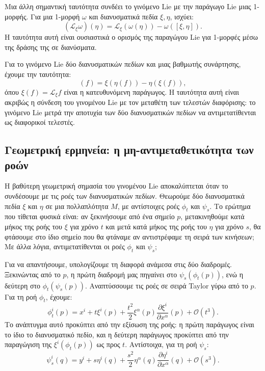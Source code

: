 \documentclass[12pt]{article}
\begin{document}
Μια άλλη σημαντική ταυτότητα συνδέει το γινόμενο Lie με την παράγωγο Lie μιας 1-μορφής. Για μια 1-μορφή $\omega$ και διανυσματικά πεδία $\xi, \eta$, ισχύει:
\begin{equation}
(\mathcal{L}_\xi \omega)(\eta) = \mathcal{L}_\xi (\omega(\eta)) - \omega([\xi, \eta]).
\end{equation}
Η ταυτότητα αυτή είναι ουσιαστικά ο ορισμός της παραγώγου Lie για 1-μορφές μέσω της δράσης της σε διανύσματα.

Για το γινόμενο Lie δύο διανυσματικών πεδίων και μιας βαθμωτής συνάρτησης, έχουμε την ταυτότητα:
\begin{equation}
[\xi, \eta](f) = \xi(\eta(f)) - \eta(\xi(f)),
\end{equation}
όπου $\xi(f) = \mathcal{L}_\xi f$ είναι η κατευθυνόμενη παράγωγος. Η ταυτότητα αυτή είναι ακριβώς η σύνδεση του γινομένου Lie με τον μεταθέτη των τελεστών διαφόρισης: το γινόμενο Lie μετρά την αποτυχία των δύο διανυσματικών πεδίων να αντιμετατίθενται ως διαφορικοί τελεστές.

\subsection{Γεωμετρική ερμηνεία: η μη-αντιμεταθετικότητα των ροών}

Η βαθύτερη γεωμετρική σημασία του γινομένου Lie αποκαλύπτεται όταν το συνδέσουμε με τις ροές των διανυσματικών πεδίων. Θεωρούμε δύο διανυσματικά πεδία $\xi$ και $\eta$ σε μια πολλαπλότητα $M$, με αντίστοιχες ροές $\phi_t$ και $\psi_s$. Το ερώτημα που τίθεται φυσικά είναι: αν ξεκινήσουμε από ένα σημείο $p$, μετακινηθούμε κατά μήκος της ροής του $\xi$ για χρόνο $t$ και μετά κατά μήκος της ροής του $\eta$ για χρόνο $s$, θα φτάσουμε στο ίδιο σημείο που θα φτάναμε αν αντιστρέφαμε τη σειρά των κινήσεων; Με άλλα λόγια, αντιμετατίθενται οι ροές $\phi_t$ και $\psi_s$;

Για να απαντήσουμε, υπολογίζουμε τη διαφορά ανάμεσα στις δύο διαδρομές. Ξεκινώντας από το $p$, η πρώτη διαδρομή μας πηγαίνει στο $\psi_s(\phi_t(p))$, ενώ η δεύτερη στο $\phi_t(\psi_s(p))$. Αναπτύσσουμε τις ροές σε σειρά Taylor γύρω από το $p$. Για τη ροή $\phi_t$, έχουμε:
\begin{equation}
\phi_t^i(p) = x^i + t \xi^i(p) + \frac{t^2}{2} \xi^\alpha(p) \frac{\partial \xi^i}{\partial x^\alpha}(p) + \mathcal{O}(t^3).
\end{equation}
Το ανάπτυγμα αυτό προκύπτει από την εξίσωση της ροής: η πρώτη παράγωγος είναι το ίδιο το διανυσματικό πεδίο, και η δεύτερη παράγωγος προκύπτει από την παραγώγιση της $\xi^i(\phi_t(p))$ ως προς $t$. Αντίστοιχα, για τη ροή $\psi_s$:
\begin{equation}
\psi_s^i(q) = y^i + s \eta^i(q) + \frac{s^2}{2} \eta^\alpha(q) \frac{\partial \eta^i}{\partial x^\alpha}(q) + \mathcal{O}(s^3).
\end{equation}
\end{document}
